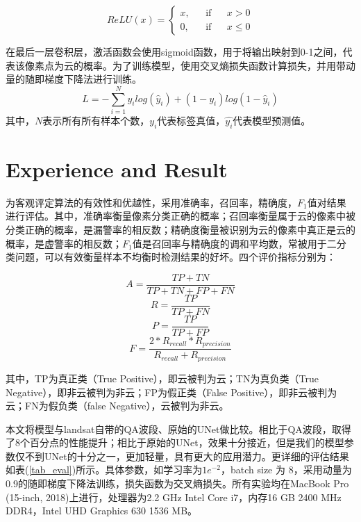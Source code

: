 \documentclass[UTF8]{ctexart}
\begin{document}
\begin{equation}
    ReLU(x)=\left\{
    \begin{aligned}
        x, & &\text{if} & & x > 0 \\
        0, & &\text{if} & & x \leq 0
    \end{aligned}
    \right.
\end{equation}

在最后一层卷积层，激活函数会使用sigmoid函数，用于将输出映射到0-1之间，代表该像素点为云的概率。为了训练模型，使用交叉熵损失函数计算损失，并用带动量的随即梯度下降法进行训练。
\begin{equation}
    L = -\sum_{i=1}^N y_ilog(\hat{y}_i)+(1-y_i)log(1-\hat{y}_i)
\end{equation}
其中，$N$表示所有所有样本个数，$y_i$代表标签真值，$\hat{y_i}$代表模型预测值。

\section[]{Experience and Result}

为客观评定算法的有效性和优越性，采用准确率，召回率，精确度，$F_1$值对结果进行评估。其中，准确率衡量像素分类正确的概率；召回率衡量属于云的像素中被分类正确的概率，是漏警率的相反数；精确度衡量被识别为云的像素中真正是云的概率，是虚警率的相反数；$F_1$值是召回率与精确度的调和平均数，常被用于二分类问题，可以有效衡量样本不均衡时检测结果的好坏。四个评价指标分别为：

\begin{equation}
    A = \frac{TP + TN}{TP + TN + FP + FN}\label{acc}
\end{equation}
\begin{equation}
    R = \frac{TP}{TP + FN}\label{recall}
\end{equation}
\begin{equation}
    P = \frac{TP}{TP + FP}\label{precision}
\end{equation}
\begin{equation}
    F = \frac{2 * R_{recall} * R_{precision}}{R_{recall} + R_{precision}}\label{f1}
\end{equation}

其中，TP为真正类（True Positive），即云被判为云；TN为真负类（True Negative），即非云被判为非云；FP为假正类（False Positive），即非云被判为云；FN为假负类（false Negative），云被判为非云。

本文将模型与landsat自带的QA波段、原始的UNet做比较。相比于QA波段，取得了8个百分点的性能提升；相比于原始的UNet，效果十分接近，但是我们的模型参数仅不到UNet的十分之一，更加轻量，具有更大的应用潜力。更详细的评估结果如表(\ref{tab_eval})所示。具体参数，如学习率为$1e^{-2}$，batch size 为 8，采用动量为0.9的随即梯度下降法训练，损失函数为交叉熵损失。所有实验均在MacBook Pro (15-inch, 2018)上进行，处理器为2.2 GHz Intel Core i7，内存16 GB 2400 MHz DDR4，Intel UHD Graphics 630 1536 MB。
\end{document}
